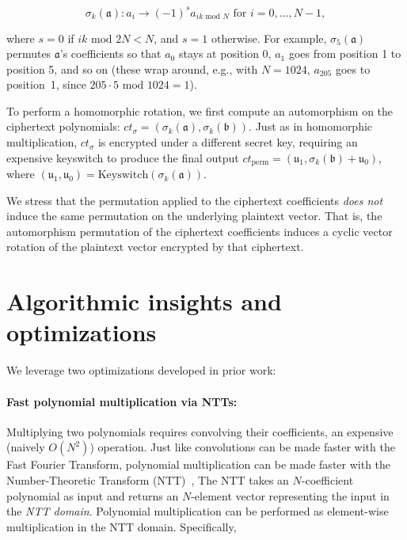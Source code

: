 \begin{equation*}
  \sigma_k(\mathfrak{a}): a_i \rightarrow (-1)^{s} a_{ik \textrm{ mod } N} \text{ for } i=0,...,N-1,
\end{equation*}

where $s=0$ if $ik \textrm{ mod } 2N < N$, and $s=1$ otherwise. For example,
$\sigma_{5}(\mathfrak{a})$ permutes $\mathfrak{a}$'s coefficients so that $a_0$
stays at position 0, $a_1$ goes from position 1 to position 5, and so on (these
wrap around, e.g., with $N=1024$, $a_{205}$ goes to position~1, since
$205\cdot5 \textrm{ mod } 1024 = 1$).

To perform a homomorphic rotation, we first compute an automorphism on the
ciphertext polynomials: $ct_{\sigma} = (\sigma_k(\mathfrak{a}),
\sigma_k(\mathfrak{b}))$. Just as in homomorphic multiplication, $ct_{\sigma}$
is encrypted under a different secret key, requiring an expensive keyswitch to
produce the final output $ct_{\text{perm}} = (\mathfrak{u}_1,
\sigma_{k}(\mathfrak{b}) + \mathfrak{u}_0)$, where $(\mathfrak{u}_1,
\mathfrak{u}_0) = \text{Keyswitch}(\sigma_k (\mathfrak{a}))$.

We stress that the permutation applied to the ciphertext coefficients \emph{does not} induce
the same permutation on the underlying plaintext vector. That is, the automorphism
permutation of the ciphertext coefficients induces a cyclic vector rotation of the
plaintext vector encrypted by that ciphertext.


\section{Algorithmic insights and optimizations}\label{sec:algoInsights}
\label{sec:fhe_optimizations}

We leverage two optimizations developed in prior work:

\paragraph{Fast polynomial multiplication via NTTs:} Multiplying two
polynomials requires convolving their coefficients, an expensive (naively
$O(N^2)$) operation. Just like convolutions can be made faster with the Fast
Fourier Transform, polynomial multiplication can be made faster with the
Number-Theoretic Transform (NTT)~\cite{moenck1976practical}, The NTT takes an
$N$\hyp{}coefficient polynomial as input and returns an $N$\hyp{}element vector
representing the input in the \textit{NTT domain}. Polynomial multiplication
can be performed as element-wise multiplication in the NTT domain.
Specifically,

